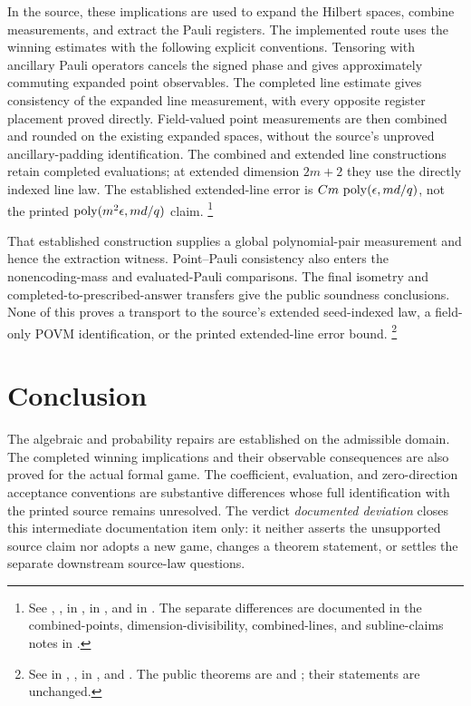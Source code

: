 \documentclass[11pt]{article}
\begin{document}
In the source, these implications are used to expand the Hilbert spaces,
combine measurements, and extract the Pauli registers. The implemented route
uses the winning estimates with the following explicit
conventions. Tensoring with ancillary Pauli operators cancels the signed phase
and gives approximately commuting expanded point observables. The completed
line estimate gives consistency of the expanded line measurement, with every
opposite register placement proved directly. Field-valued point measurements
are then combined and rounded on the existing expanded spaces, without the
source's unproved ancillary-padding identification. The combined and extended
line constructions retain completed evaluations; at extended dimension $2m+2$
they use the directly indexed line law. The established extended-line error is
$C m\,\operatorname{poly}(\epsilon,md/q)$, not the printed
$\operatorname{poly}(m^2\epsilon,md/q)$ claim.%
\footnote{See ,
,
 in
,
 in
, and
 in
. The separate differences are
documented in the combined-points, dimension-divisibility, combined-lines,
and subline-claims notes in .}

That established construction supplies a global polynomial-pair measurement
and hence the extraction witness. Point--Pauli consistency also enters the
nonencoding-mass and evaluated-Pauli comparisons. The final isometry and
completed-to-prescribed-answer transfers give the public soundness conclusions.
None of this proves a transport to the source's extended seed-indexed law, a
field-only POVM identification, or the printed extended-line error bound.%
\footnote{See  in
,
,
 in
, and
.
The public theorems are  and
; their statements are unchanged.}

\section{Conclusion}

The algebraic and probability repairs are established on the admissible domain.
The completed winning implications and their observable consequences are also
proved for the actual formal game. The coefficient, evaluation, and
zero-direction acceptance conventions are substantive differences whose full
identification with the printed source remains unresolved. The verdict
\emph{documented deviation} closes this intermediate documentation item only:
it neither asserts the unsupported source claim nor adopts a new game, changes
a theorem statement, or settles the separate downstream source-law questions.



\end{document}
